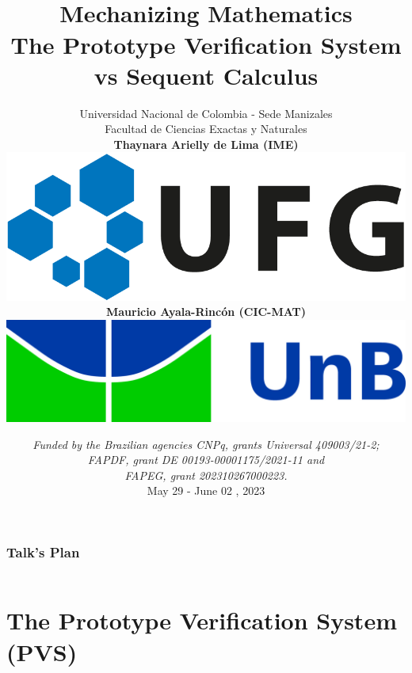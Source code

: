 \documentclass[10pt]{beamer}
\title
[Mechanizing Mathematics]
{\vspace{-5mm}
\\%
{\bf\Large Mechanizing Mathematics}\\
{\large The Prototype Verification System vs Sequent Calculus}  \vspace{-.1cm}}
\author[M. Ayala-Rinc\'on (UnB) \& T. A. de Lima (UFG)]
{Universidad Nacional de Colombia - Sede Manizales \\
Facultad de Ciencias Exactas y Naturales\\[6mm]
\textbf{Thaynara Arielly de Lima
  (IME)}   \includegraphics[scale=.18]{../1_Intr_Math_Deduction/ufg.png}\\
\textbf{Mauricio Ayala-Rinc\'on (CIC-MAT)} \includegraphics[scale=.03]{../1_Intr_Math_Deduction/unb.jpg}
\vspace{-.8cm}}
\date[Universidad Nacional de Colombia - Sede Manizales]{{\scriptsize\it Funded by the Brazilian agencies CNPq, grants Universal 409003/21-2; \\ FAPDF, grant DE 00193-00001175/2021-11 and \\ FAPEG, grant 202310267000223.}
\\ May 29 - June 02 ,
  2023}
\begin{document}
\begin{frame}
\maketitle
\end{frame}
\begin{frame}
\frametitle{Talk's Plan}
\begin{columns}
\begin{column}{10cm}
\tableofcontents
\end{column}
\end{columns}
\end{frame}






\section{The Prototype Verification System (PVS)}
\end{document}
